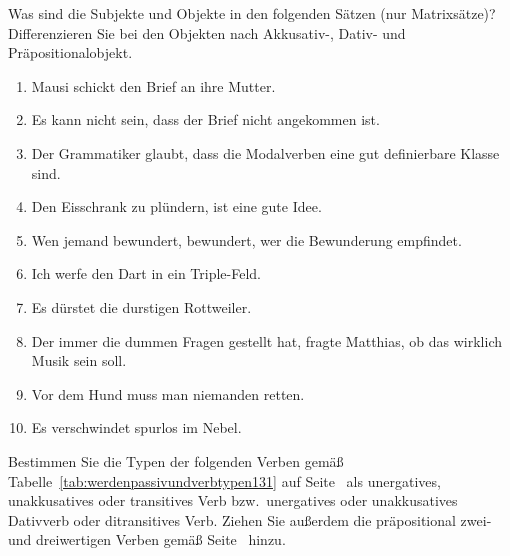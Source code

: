 
\Uebungen

 \label{exc:relationenundpraedikate01} Was sind die Subjekte und Objekte in den folgenden Sätzen (nur Matrixsätze)?
Differenzieren Sie bei den Objekten nach Akkusativ-, Dativ- und Präpositionalobjekt.

\begin{enumerate}
  \item Mausi schickt den Brief an ihre Mutter.
  \item Es kann nicht sein, dass der Brief nicht angekommen ist.
  \item Der Grammatiker glaubt, dass die Modalverben eine gut definierbare Klasse sind.
  \item Den Eisschrank zu plündern, ist eine gute Idee.
  \item Wen jemand bewundert, bewundert, wer die Bewunderung empfindet.
  \item Ich werfe den Dart in ein Triple-Feld.
  \item Es dürstet die durstigen Rottweiler.
  \item Der immer die dummen Fragen gestellt hat, fragte Matthias, ob das wirklich Musik sein soll.
  \item Vor dem Hund muss man niemanden retten.
  \item Es verschwindet spurlos im Nebel.
\end{enumerate}


 \label{exc:relationenundpraedikate02} Bestimmen Sie die Typen der folgenden Verben gemäß Tabelle~\ref{tab:werdenpassivundverbtypen131} auf Seite~\pageref{tab:werdenpassivundverbtypen131} als unergatives, unakkusatives oder transitives Verb bzw.\ unergatives oder unakkusatives Dativverb oder ditransitives Verb.
Ziehen Sie außerdem die präpositional zwei- und dreiwertigen Verben gemäß Seite~\pageref{abs:valenz093} hinzu.

